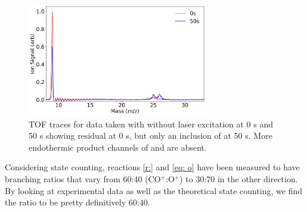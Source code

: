 \begin{figure}[H]
	\centering
	\includegraphics[width=0.7\textwidth]{images/Be_O2_no_laser_TOF.png}
	\caption{TOF traces for data taken with without laser excitation at 0 s and 50 s showing residual  at 0 s, but only an inclusion of  at 50 s. More endothermic product channels of  and  are absent.}
	\label{fig: non laser TOF}
\end{figure}

Considering state counting, reactions \ref{r:} and \ref{eq: o} have been measured to have branching ratios that vary from 60:40 (CO$^+$:O$^+$) to 30:70 in the other direction. By looking at experimental data as well as the theoretical state counting, we find the ratio to be pretty definitively 60:40.
